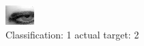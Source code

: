 \begin{figure}[h!]
\begin{center}
\includegraphics[width=0.60\columnwidth]{figures/ID2047_class_1_target_2.png}
\end{center}
\caption{ Classification: 1 actual target: 2}
\label{fig:ID2047_class_1_target_2}
\end{figure}
